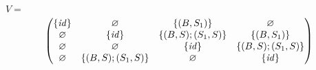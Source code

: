 $V=$
\begin{align*}
\begin{pmatrix}
      \{ \text{\emph{id}} \}       & \varnothing       & \{(B,S_1)\}       & \varnothing  \\ 
      \varnothing       & \{ \text{\emph{id}} \}       & \{(B,S);(S_1,S)\} & \{(B,S_1)\}  \\
      \varnothing       & \varnothing       & \{ \text{\emph{id}} \}       & \{(B,S);(S_1,S)\}  \\
      \varnothing       & \{(B,S);(S_1,S)\} & \varnothing       & \{ \text{\emph{id}} \}  \\
\end{pmatrix}
\end{align*}


